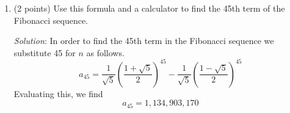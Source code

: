 \documentclass{article}
\begin{document}
\begin{enumerate}
        Left multiplying by $P$,
        \begin{align*}
          P(D^{n}P^{-1}\vec{x}_0) & = \frac{1}{\sqrt{5}}\begin{bmatrix}
                                                          \varphi & 1-\varphi \\
                                                          1       & 1
                                                        \end{bmatrix}\begin{bmatrix}
                                                                       \varphi^n \\
                                                                       -(1-\varphi)^n
                                                                     \end{bmatrix}       \\[1ex]
                                  & = \frac{1}{\sqrt{5}}\begin{bmatrix}
                                                          \varphi^{n+1} - (1-\varphi)^{n+1} \\
                                                          \varphi^n-(1-\varphi)^n
                                                        \end{bmatrix}
        \end{align*}

        Recall that it was given in the prompt that $\vec{x}_n = \begin{bmatrix}
            a_{n+1} \\
            a_n
          \end{bmatrix}$. Taking this together with our last derivation, note that
        \begin{align*}
          a_n = \tfrac{1}{\sqrt{5}}(\varphi^n - (1 - \varphi)^n)
        \end{align*}


        Finally, substituting $\varphi$ and $1-\varphi$, we obtain the formula for $a_n$ that we were seeking to verify.
        \begin{equation}
          a_n = \frac{1}{\sqrt{5}} \left( \frac{1 + \sqrt{5}}{2} \right)^n-\frac{1}{\sqrt{5}} \left( \frac{1 - \sqrt{5}}{2} \right)^n
        \end{equation}

        This is also the formula for the $n$th term of the Fibonacci sequence.

  \item (2 points) Use this formula and a calculator to find the 45th term of the Fibonacci sequence.

        \emph{Solution}: In order to find the 45th term in the Fibonacci sequence we substitute 45 for $n$ as follows.
        \[
          a_{45} = \frac{1}{\sqrt{5}} \left( \frac{1 + \sqrt{5}}{2} \right)^{45} -\frac{1}{\sqrt{5}} \left( \frac{1 - \sqrt{5}}{2} \right)^{45}
        \]
        Evaluating this, we find
        \[
          a_{45}=1{,}134{,}903{,}170
        \]


\end{enumerate}

\pagebreak
\printbibliography
\end{document}
